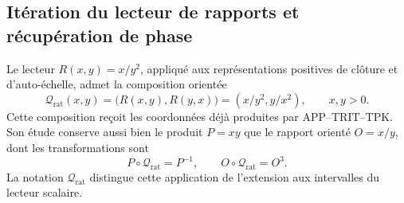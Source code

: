 \subsection{Itération du lecteur de rapports et récupération de phase}
\label{corpus9:iv:q}

Le lecteur \(R(x,y)=x/y^2\), appliqué aux représentations positives
de clôture et d’auto-échelle, admet la composition orientée
\[
 \mathcal Q_{\mathrm{rat}}(x,y)
   =\bigl(R(x,y),R(y,x)\bigr)
   =(x/y^2,y/x^2),\qquad x,y>0.
\]
Cette composition reçoit les coordonnées déjà produites par
APP--TRIT--TPK. Son étude conserve aussi bien le produit \(P=xy\)
que le rapport orienté \(O=x/y\), dont les transformations sont
\[
 P\circ\mathcal Q_{\mathrm{rat}}=P^{-1},\qquad
 O\circ\mathcal Q_{\mathrm{rat}}=O^3.
\]
La notation \(\mathcal Q_{\mathrm{rat}}\) distingue cette application
de l’extension aux intervalles du lecteur scalaire.

